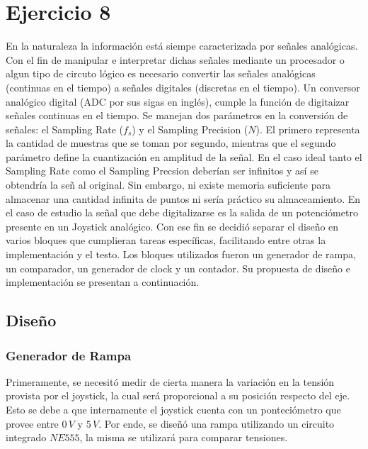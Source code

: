 \section{Ejercicio 8}
En la naturaleza la informaci\'on est\'a siempe caracterizada por señales anal\'ogicas. Con el fin de manipular e interpretar dichas señales mediante un procesador o algun tipo de circuto l\'ogico es necesario convertir las señales anal\'ogicas (continuas en el tiempo) a señales digitales (discretas en el tiempo). Un conversor anal\'ogico digital (ADC por sus sigas en ingl\'es), cumple la funci\'on de digitaizar señales continuas en el tiempo. Se manejan dos par\'ametros en la conversi\'on de señales: el Sampling Rate ($f_s$) y el Sampling Precision ($N$). El primero representa la cantidad de muestras que se toman por segundo, mientras que el segundo par\'ametro define la cuantizaci\'on en amplitud de la señal. En el caso ideal tanto el Sampling Rate como el Sampling Precsion deber\'ian ser infinitos y as\'i se obtendr\'ia la señ al original. Sin embargo, ni existe memoria suficiente para almacenar una cantidad infinita de puntos ni ser\'ia pr\'actico su almaceamiento. En el caso de estudio la señal que debe digitalizarse es la salida de un potenci\'ometro presente en un Joystick anal\'ogico. Con ese fin se decidió separar el diseño en varios bloques que cumplieran tareas específicas, facilitando entre otras la implementación y el testo. Los bloques utilizados fueron un generador de rampa, un comparador, un generador de clock y un contador. Su propuesta de diseño e implementación se presentan a continuación. \par



\subsection{Diseño}

\subsubsection{Generador de Rampa}

Primeramente, se necesitó medir de cierta manera la variación en la tensión provista por el joystick, la cual será proporcional a su posición respecto del eje. Esto se debe a que internamente el joystick cuenta con un ponteciómetro que provee entre $0\,V$ y $5\,V$. Por ende, se diseñó una rampa utilizando un circuito integrado $NE555$, la misma se utilizará para comparar tensiones. \par

